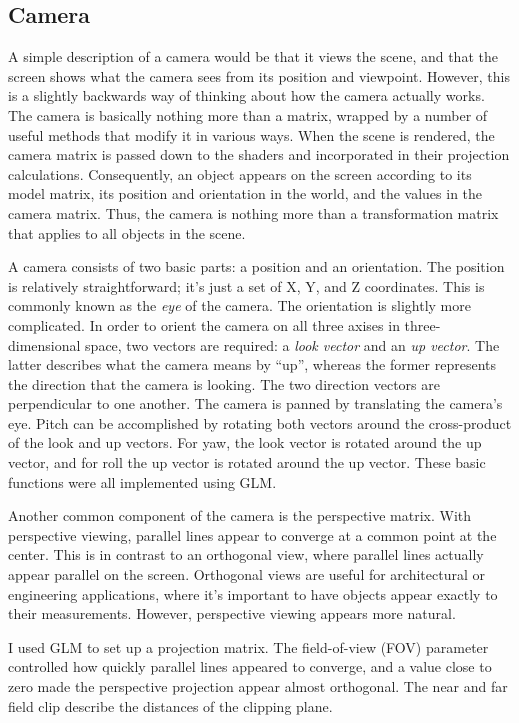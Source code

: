 \documentclass[journal]{IEEEtran}
\begin{document}
\subsection{Camera}

A simple description of a camera would be that it views the scene, and that the screen shows what the camera sees from its position and viewpoint. However, this is a slightly backwards way of thinking about how the camera actually works. The camera is basically nothing more than a matrix, wrapped by a number of useful methods that modify it in various ways. When the scene is rendered, the camera matrix is passed down to the shaders and incorporated in their projection calculations. Consequently, an object appears on the screen according to its model matrix, its position and orientation in the world, and the values in the camera matrix. Thus, the camera is nothing more than a transformation matrix that applies to all objects in the scene.

A camera consists of two basic parts: a position and an orientation. The position is relatively straightforward; it's just a set of X, Y, and Z coordinates. This is commonly known as the \textit{eye} of the camera. The orientation is slightly more complicated. In order to orient the camera on all three axises in three-dimensional space, two vectors are required: a \textit{look vector} and an \textit{up vector}. The latter describes what the camera means by ``up'', whereas the former represents the direction that the camera is looking. The two direction vectors are perpendicular to one another. The camera is panned by translating the camera's eye. Pitch can be accomplished by rotating both vectors around the cross-product of the look and up vectors. For yaw, the look vector is rotated around the up vector, and for roll the up vector is rotated around the up vector. These basic functions were all implemented using GLM.

Another common component of the camera is the perspective matrix. With perspective viewing, parallel lines appear to converge at a common point at the center. This is in contrast to an orthogonal view, where parallel lines actually appear parallel on the screen. Orthogonal views are useful for architectural or engineering applications, where it's important to have objects appear exactly to their measurements. However, perspective viewing appears more natural.

I used GLM to set up a projection matrix. The field-of-view (FOV) parameter controlled how quickly parallel lines appeared to converge, and a value close to zero made the perspective projection appear almost orthogonal. The near and far field clip describe the distances of the clipping plane.
\end{document}
